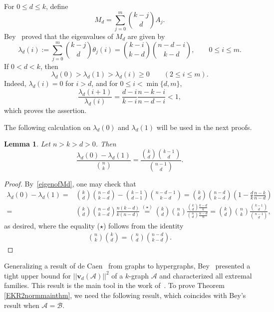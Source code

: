 \documentclass[10pt,a4paper]{amsart}
\numberwithin{equation}{section}
\newtheorem{lemma}[theorem]{Lemma}
\def\A{\mathcal{A}}
\def\B{\mathcal{B}}
\begin{document}
For $0\leq d\leq k$, define
\[
M_d=\sum_{j=0}^{m}\binom{k-j}{d}A_j.
\]
Bey~\cite{Bey} proved that the eigenvalues of $M_d$ are given by
\begin{equation}\label{eigenofMd}
\lambda_d(i)
:=\sum_{j=0}^{m}\binom{k-j}{d}\theta_j(i)
=\binom{k-i}{k-d}\binom{n-d-i}{k-d},
\qquad 0\leq i\leq m.
\end{equation}
If $0<d<k$, then
\[
\lambda_d(0)>\lambda_d(1)>\lambda_d(i)\geq0
\qquad (2\leq i\leq m).
\]
Indeed,
$\lambda_d(i)=0$ for $i>d$, and for
$0\leq i<\min\{d,m\}$,
\[
\frac{\lambda_d(i+1)}{\lambda_d(i)}
=\frac{d-i}{k-i}\frac{n-k-i}{n-d-i}<1,
\]
which proves the assertion.

The following calculation on $\lambda _d(0)$ and $\lambda _d(1)$ will be used in the next proofs.


\begin{lemma}\label{eigenvalue01ofMd}
Let $n>k>d>0$.  Then
\[
\frac{\lambda_d(0)-\lambda_d(1)}{\binom{n}{k}}
=\frac{\binom{k}{d}\binom{k-1}{d}}{\binom{n-1}{d}}.
\]
\end{lemma}

\begin{proof}
By~\eqref{eigenofMd}, one may check that
\begin{align*}
\lambda _d(0)-\lambda _d(1) =&\binom{k }{ d}
\binom{n-d}{k-d}
-   \binom{k-1}{ d-1}
\binom{n-d-1}{k-d}
= \binom{k}{d}\binom{n-d}{k-d}
\left(1- \frac{d}{k} \frac{n-k}{n-d} \right)\\
=&  \binom{k}{d}\binom{n-d}{k-d}
\frac{n(k-d)} {k(n-d)}
\overset{(\star)}{=}\binom{k}{d} \binom{n}{k} \frac{\binom{k}{d} \frac{k-d}{k}} {\binom{n}{d}\frac{n-d}{n}   }
=\binom{k}{d}\binom{n}{k} \frac{\binom{k-1}{d}}{\binom{n-1}{d}},
\end{align*}
as desired,
where the equality ($\star$) follows from the identity
\begin{align*}\binom{n}{k}\binom{k}{d}
=\binom{n}{d}\binom{n-d}{k-d}.  \tag*{\qedhere}
\end{align*}
\end{proof}

Generalizing a result of de Caen~\cite[Theorem 1]{Caen} from graphs to hypergraphs,
Bey~\cite[Theorem 1]{Bey} presented a tight upper bound for
$||\mathbf{v}_{d}(\A)||^2$ of a $k$-graph $\A$ and characterized all extremal families.
This result is the main tool in the work of~\cite{Brooks}.
To prove Theorem \ref{EKR2normmainthm}, we need the following result, which
coincides with Bey's result when $\A=\B$.
\end{document}
